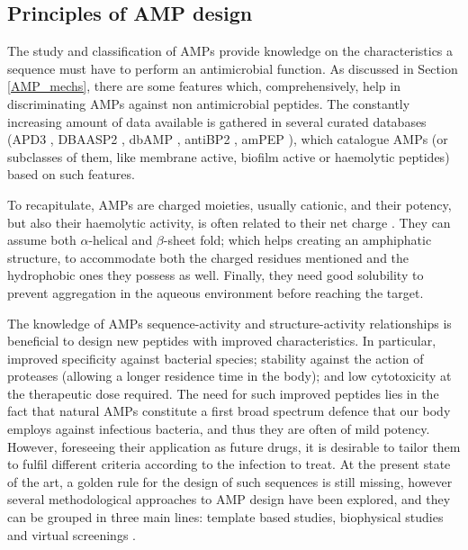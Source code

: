 \subsection{Principles of AMP design} \label{sec:amp_design}

The study and classification of AMPs provide knowledge on the characteristics a sequence must have to perform an antimicrobial function.
%
As discussed in Section \ref{AMP_mechs}, there are some features which, comprehensively, help in discriminating AMPs against non antimicrobial peptides. The constantly increasing amount of data available is gathered in several curated databases (APD3 \citep{APD3}, DBAASP2 \citep{DBAASP2}, dbAMP \citep{dbAMP}, antiBP2 \citep{antiBP2}, amPEP \citep{amPEP}), which catalogue AMPs (or subclasses of them, like membrane active, biofilm active or haemolytic peptides) based on such features.

To recapitulate, AMPs are charged moieties, usually cationic, and their potency, but also their haemolytic activity, is often related to their net charge \citep{Jiang2011}. They can assume both $\alpha$-helical and $\beta$-sheet fold; which helps creating an amphiphatic structure, to accommodate both the charged residues mentioned and the hydrophobic ones they possess as well. Finally, they need good solubility to prevent aggregation in the aqueous environment before reaching the target.


The knowledge of AMPs sequence-activity and structure-activity relationships is beneficial to design new peptides with improved characteristics. In particular, improved specificity against bacterial species; stability against the action of proteases (allowing a longer residence time in the body); and low cytotoxicity at the therapeutic dose required.
The need for such improved peptides lies in the fact that natural AMPs constitute a first broad spectrum defence that our body employs against infectious bacteria, and thus they are often of mild potency. However, foreseeing their application as future drugs, it is desirable to tailor them to fulfil different criteria according to the infection to treat.
%
At the present state of the art, a golden rule for the design of such sequences is still missing, however several methodological approaches to AMP design have been explored, and they can be grouped in three main lines: template based studies, biophysical studies and virtual screenings \citep{Fjell2011}.

